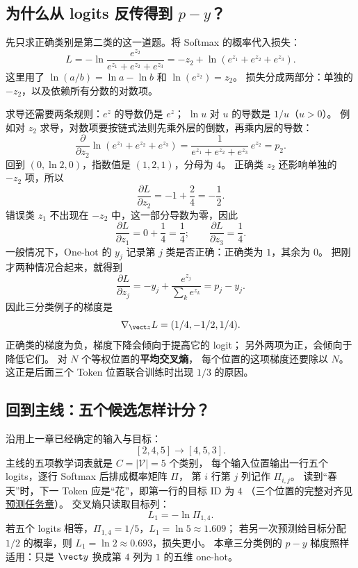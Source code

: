 \subsection{\texorpdfstring{为什么从 logits 反传得到 $p-y$？}{为什么从 logits 反传得到 p 减 y？}}
\label{concept:logit-gradient}

先只求正确类别是第二类的这一道题。将 Softmax 的概率代入损失：
\[
L=-\ln\frac{e^{z_2}}{e^{z_1}+e^{z_2}+e^{z_3}}
=-z_2+\ln(e^{z_1}+e^{z_2}+e^{z_3}).
\]
这里用了 $\ln(a/b)=\ln a-\ln b$ 和 $\ln(e^{z_2})=z_2$。
损失分成两部分：单独的 $-z_2$，以及依赖所有分数的对数项。

求导还需要两条规则：$e^z$ 的导数仍是 $e^z$；
$\ln u$ 对 $u$ 的导数是 $1/u$（$u>0$）。
例如对 $z_2$ 求导，对数项要按链式法则先乘外层的倒数，再乘内层的导数：
\[
\frac{\partial}{\partial z_2}\ln(e^{z_1}+e^{z_2}+e^{z_3})
=\frac{1}{e^{z_1}+e^{z_2}+e^{z_3}}\,e^{z_2}=p_2.
\]
回到 $(0,\ln2,0)$，指数值是 $(1,2,1)$，分母为 $4$。
正确类 $z_2$ 还影响单独的 $-z_2$ 项，所以
\[
\frac{\partial L}{\partial z_2}=-1+\frac24=-\frac12.
\]
错误类 $z_1$ 不出现在 $-z_2$ 中，这一部分导数为零，因此
\[
\frac{\partial L}{\partial z_1}=0+\frac14=\frac14;
\qquad \frac{\partial L}{\partial z_3}=\frac14.
\]
一般情况下，One-hot 的 $y_j$ 记录第 $j$ 类是否正确：正确类为 $1$，其余为 $0$。
把刚才两种情况合起来，就得到
\[
\frac{\partial L}{\partial z_j}
=-y_j+\frac{e^{z_j}}{\sum_k e^{z_k}}
=\boxed{p_j-y_j}.
\]
因此三分类例子的梯度是
\[
\nabla_{\vect z}L=(1/4,-1/2,1/4).
\]
正确类的梯度为负，梯度下降会倾向于提高它的 logit；
另外两项为正，会倾向于降低它们。
对 $N$ 个等权位置的\textbf{平均交叉熵}，
每个位置的这项梯度还要除以 $N$。
这正是后面三个 Token 位置联合训练时出现 $1/3$ 的原因。

\subsection{回到主线：五个候选怎样计分？}

沿用上一章已经确定的输入与目标：
\[
[2,4,5]\longrightarrow[4,5,3].
\]
主线的五项教学词表就是 $C=|\mathcal V|=5$ 个类别，
每个输入位置输出一行五个 logits，逐行 Softmax 后排成概率矩阵 $\Pi$，
第 $i$ 行第 $j$ 列记作 $\Pi_{i,j}$。
读到“春天”时，下一 Token 应是“花”，即第一行的目标 ID 为 $4$
（三个位置的完整对齐见\hyperref[intro:20b-task-contract]{预测任务章}）。
交叉熵只读取目标列：
\[
L_1=-\ln\Pi_{1,4}.
\]
若五个 logits 相等，$\Pi_{1,4}=1/5$，$L_1=\ln5\approx1.609$；
若另一次预测给目标分配 $1/2$ 的概率，则 $L_1=\ln2\approx0.693$，损失更小。
本章三分类例的 $p-y$ 梯度照样适用：只是 $\vect y$ 换成第 $4$ 列为 $1$ 的五维 one-hot。

